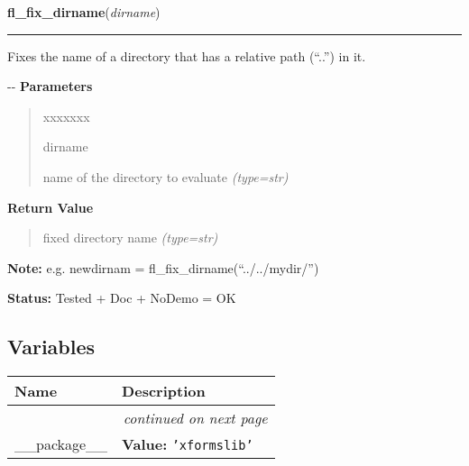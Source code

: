 \hspace{.8\funcindent}\begin{boxedminipage}{\funcwidth}

    \raggedright \textbf{fl\_fix\_dirname}(\textit{dirname})

    \vspace{-1.5ex}

    \rule{\textwidth}{0.5\fboxrule}
\setlength{\parskip}{2ex}

Fixes the name of a directory that has a relative path (``..'') in it.

-{}-
\setlength{\parskip}{1ex}
      \textbf{Parameters}
      \vspace{-1ex}

      \begin{quote}
        \begin{Ventry}{xxxxxxx}

          \item[dirname]


name of the directory to evaluate
            {\it (type=str)}

        \end{Ventry}

      \end{quote}

      \textbf{Return Value}
    \vspace{-1ex}

      \begin{quote}

fixed directory name
      {\it (type=str)}

      \end{quote}

\textbf{Note:} 
e.g. newdirnam = fl\_fix\_dirname(``../../mydir/'')


\textbf{Status:} 
Tested + Doc + NoDemo = OK


    \end{boxedminipage}



  \subsection{Variables}

    \vspace{-1cm}
\hspace{\varindent}\begin{longtable}{|p{\varnamewidth}|p{\vardescrwidth}|l}
\cline{1-2}
\cline{1-2} \centering \textbf{Name} & \centering \textbf{Description}& \\
\cline{1-2}
\endhead\cline{1-2}\multicolumn{3}{r}{\small\textit{continued on next page}}\\\endfoot\cline{1-2}
\endlastfoot\raggedright \_\-\_\-p\-a\-c\-k\-a\-g\-e\-\_\-\_\- & \raggedright \textbf{Value:} 
{\tt \texttt{'}\texttt{xformslib}\texttt{'}}&\\
\cline{1-2}
\end{longtable}


